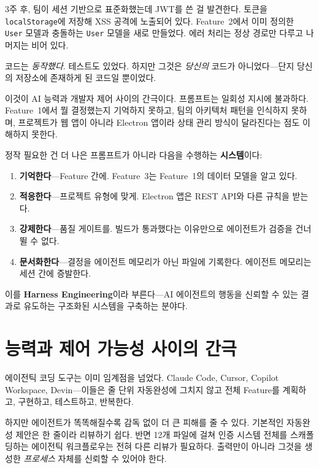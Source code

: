 \documentclass[11pt,a4paper,openright,twoside]{report}
\begin{document}
3주 후, 팀이 세션 기반으로 표준화했는데 JWT를 쓴 걸 발견한다. 토큰을 \texttt{localStorage}에 저장해 XSS 공격에 노출되어 있다. Feature~2에서 이미 정의한 \texttt{User} 모델과 충돌하는 \texttt{User} 모델을 새로 만들었다. 에러 처리는 정상 경로만 다루고 나머지는 비어 있다.

코드는 \emph{동작했다}. 테스트도 있었다. 하지만 그것은 \emph{당신의} 코드가 아니었다---단지 당신의 저장소에 존재하게 된 코드일 뿐이었다.

이것이 AI 능력과 개발자 제어 사이의 간극이다. 프롬프트는 일회성 지시에 불과하다. Feature~1에서 뭘 결정했는지 기억하지 못하고, 팀의 아키텍처 패턴을 인식하지 못하며, 프로젝트가 웹 앱이 아니라 Electron 앱이라 상태 관리 방식이 달라진다는 점도 이해하지 못한다.

정작 필요한 건 더 나은 프롬프트가 아니라 다음을 수행하는 \textbf{시스템}이다:

\begin{enumerate}
  \item \textbf{기억한다}---Feature 간에. Feature~3는 Feature~1의 데이터 모델을 알고 있다.
  \item \textbf{적응한다}---프로젝트 유형에 맞게. Electron 앱은 REST API와 다른 규칙을 받는다.
  \item \textbf{강제한다}---품질 게이트를. 빌드가 통과했다는 이유만으로 에이전트가 검증을 건너뛸 수 없다.
  \item \textbf{문서화한다}---결정을 에이전트 메모리가 아닌 파일에 기록한다. 에이전트 메모리는 세션 간에 증발한다.
\end{enumerate}

이를 \textbf{Harness Engineering}이라 부른다---AI 에이전트의 행동을 신뢰할 수 있는 결과로 유도하는 구조화된 시스템을 구축하는 분야다.

\section{능력과 제어 가능성 사이의 간극}

에이전틱 코딩 도구는 이미 임계점을 넘었다. Claude Code, Cursor, Copilot Workspace, Devin---이들은 줄 단위 자동완성에 그치지 않고 전체 Feature를 계획하고, 구현하고, 테스트하고, 반복한다.

하지만 에이전트가 똑똑해질수록 감독 없이 더 큰 피해를 줄 수 있다. 기본적인 자동완성 제안은 한 줄이라 리뷰하기 쉽다. 반면 12개 파일에 걸쳐 인증 시스템 전체를 스캐폴딩하는 에이전틱 워크플로우는 전혀 다른 리뷰가 필요하다. 출력만이 아니라 그것을 생성한 \emph{프로세스} 자체를 신뢰할 수 있어야 한다.
\end{document}
